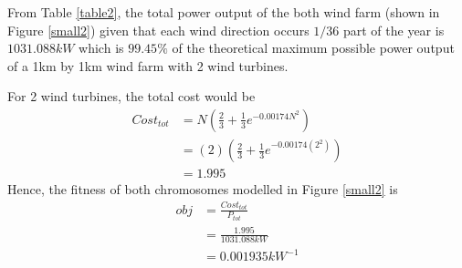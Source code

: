         From Table \ref{table2}, the total power output of the both wind farm (shown in Figure \ref{small2}) given that each wind direction occurs $1/36$ part of the year is $1031.088kW$ which is $99.45\%$ of the theoretical maximum possible power output of a 1km by 1km wind farm with 2 wind turbines.
        
        For 2 wind turbines, the total cost would be
        \begin{align*}
            Cost_{tot}
            &= N\left(\frac{2}{3} + \frac{1}{3}e^{-0.00174N^2}\right) \\
            &= \left(2\right)\left(\frac{2}{3} + \frac{1}{3}e^{-0.00174\left(2^2\right)}\right) \\
            &= 1.995
        \end{align*}
        Hence, the fitness of both chromosomes modelled in Figure \ref{small2} is
        \begin{align*}
            obj
            &=\frac{Cost_{tot}}{P_{tot}} \\
            &=\frac{1.995}{1031.088kW} \\
            &=0.001935kW^{-1}
        \end{align*}
        
